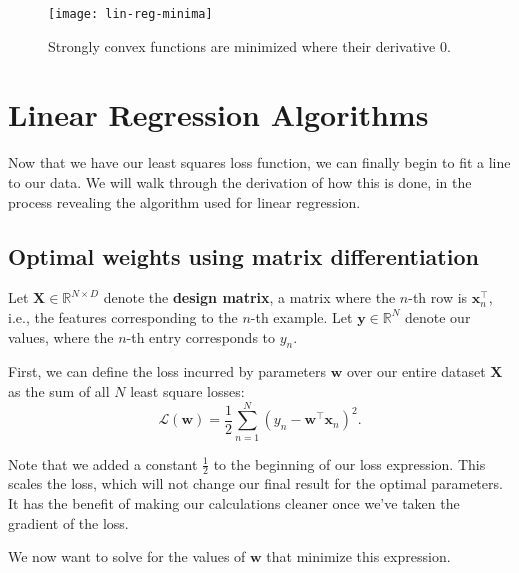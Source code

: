 \begin{figure}
    \centering
    \texttt{[image: lin-reg-minima]}
    \caption{Strongly convex functions are minimized where their derivative 0.}
    \label{fig:lin-reg-minima}
\end{figure}

\section{Linear Regression Algorithms}
Now that we have our least squares loss function, we can finally begin to fit a line to our data. We will walk through the derivation of how this is done, in the process revealing the algorithm used for linear regression.

\subsection{Optimal weights using matrix differentiation}

Let $\mathbf{X} \in \mathbb{R}^{N \times D}$ denote the \textbf{design matrix}, a matrix where the $n$-th row is $\mathbf{x}_n^\top$, i.e., the features corresponding to the $n$-th example. Let $\mathbf{y} \in \mathbb{R}^N$ denote our values, where the $n$-th entry corresponds to $y_n$.

First, we can define the loss incurred by parameters $\mathbf{w}$ over our entire dataset $\mathbf{X}$ as the sum of all $N$ least square losses: $$\mathcal{L}(\mathbf{w}) = \frac{1}{2} \sum_{n=1}^{N} (y_n - \mathbf{w}^\top \mathbf{x}_n)^2.$$

\begin{warning}
    Note that we added a constant $\frac{1}{2}$ to the beginning of our loss expression. This scales the loss, which will not change our final result for the optimal parameters. It has the benefit of making our calculations cleaner once we've taken the gradient of the loss.
\end{warning}

We now want to solve for the values of $\mathbf{w}$ that minimize this expression.

